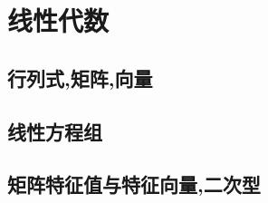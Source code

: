 \documentclass[12pt, a4paper, oneside, UTF8]{ctexbook}
\begin{document}
% 
\else
\fi
\chapter{线性代数}
\section{行列式,矩阵,向量}
\section{线性方程组}

\section{矩阵特征值与特征向量,二次型}


\ifx\allfiles\undefined
\end{document}
